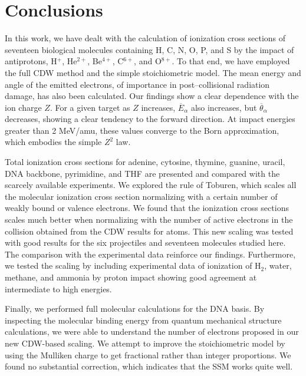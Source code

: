 \documentclass[10pt,showpacs,showkeys,twocolumn]{revtex4}
\begin{document}
\section{Conclusions}

In this work, we have dealt with the calculation of ionization cross 
sections of seventeen biological molecules containing H, C, N, O, P, and 
S by the impact of antiprotons, H$^{+}$, He$^{2+}$, Be$^{4+}$, C$^{6+}$, 
and O$^{8+}$. To that end, we have employed the full CDW method and the 
simple stoichiometric model. 
The mean energy and angle of the emitted electrons, of importance in 
post--collisional radiation damage,  has also been calculated. Our 
findings show a clear dependence with the ion charge $Z$. For a given 
target as $Z$ increases, $\overline{E}_{\alpha}$ also increases, but 
$\overline{\theta}_{\alpha}$ decreases, showing a clear tendency to the 
forward direction. At impact energies greater than 2 MeV/amu, these 
values converge to the Born approximation, which embodies the simple 
$Z^{2}$ law. 

Total ionization cross sections for adenine, cytosine, thymine, guanine, 
uracil, DNA backbone, pyrimidine, and THF are presented and compared 
with the scarcely available experiments. We explored the rule of 
Toburen, which scales all the molecular ionization cross section 
normalizing with a certain number of weakly bound or valence electrons. 
We found that the ionization cross 
sections scales much better when normalizing with the number of active 
electrons in the collision obtained from the CDW results for atoms. 
This new scaling was tested with good results for the six 
projectiles and seventeen molecules studied here. The comparison with 
the experimental data reinforce our findings. Furthermore, we tested
the scaling by including experimental data of ionization of H$_2$, 
water, methane, and ammonia by proton impact showing good agreement at
intermediate to high energies.

Finally, we performed full molecular calculations for the DNA basis. 
By inspecting the molecular binding energy from quantum mechanical
structure calculations, we were able to understand the number of 
electrons proposed in our new CDW-based scaling. We attempt to improve 
the stoichiometric model by using the Mulliken charge to get fractional
rather than integer proportions. We found no substantial correction,
which indicates that the SSM works quite well.
\end{document}
